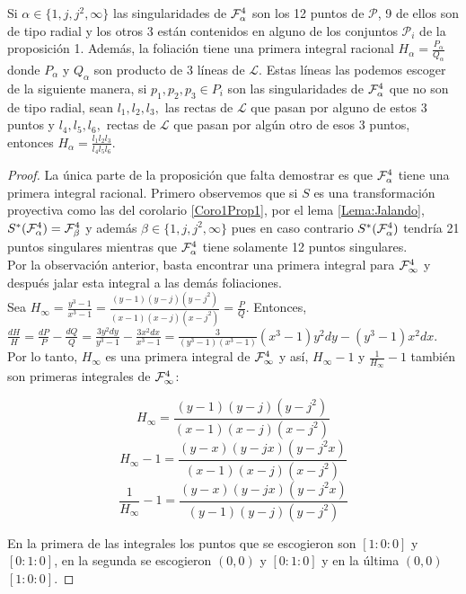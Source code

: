 \begin{Proposicion}
\label{Prop:3}
Si $\alpha\in\{1,j,j^2,\infty\}$ las singularidades de $\Fol[4]{\alpha}$ son los 12 puntos de $\mathcal{P}$, 9 de ellos son de tipo radial y los otros 3 están contenidos en alguno de los conjuntos $\mathcal{P}_i$ de la proposición 1. Además, la foliación tiene una primera integral racional $H_\alpha=\tfrac{P_\alpha}{Q_\alpha}$ donde $P_\alpha$ y $Q_\alpha$ son producto de 3 líneas de $\mathcal{L}$. Estas líneas las podemos escoger de la siguiente manera, si $p_1,p_2,p_3\in\mathit{P}_i$ son las singularidades de $\Fol[4]{\alpha}$ que no son de tipo radial, sean $\mathit{l}_1, \mathit{l}_2, \mathit{l}_3,$ las rectas de $\mathcal{L}$ que pasan por alguno de estos 3 puntos y $\mathit{l}_4, \mathit{l}_5, \mathit{l}_6,$ rectas de $\mathcal{L}$ que pasan por algún otro de esos 3 puntos, entonces $H_\alpha=\tfrac{\mathit{l}_1\mathit{l}_2\mathit{l}_3}{\mathit{l}_4\mathit{l}_5\mathit{l}_6}$.
\end{Proposicion}

\begin{proof}
La única parte de la proposición que falta demostrar es que $\Fol[4]{\alpha}$ tiene una primera integral racional. Primero observemos que si $S$ es una transformación proyectiva como las del corolario \ref{Coro1Prop1}, por el lema \ref{Lema:Jalando}, $S^*(\Fol[4]{\alpha})=\Fol[4]{\beta}$ y además $\beta\in\{1,j,j^2,\infty\}$ pues en caso contrario $S^*(\Fol[4]{\alpha})$ tendría 21 puntos singulares mientras que $\Fol[4]{\alpha}$ tiene solamente 12 puntos singulares.
\\

Por la observación anterior, basta encontrar una primera integral para $\Fol[4]{\infty}$ y después jalar esta integral a las demás foliaciones.
\\

Sea $H_\infty = \tfrac{y^3-1}{x^3-1} = \tfrac{(y-1)(y-j)(y-j^2)}{(x-1)(x-j)(x-j^2)} = \tfrac{P}{Q}$. Entonces, $\tfrac{dH}{H} = \tfrac{dP}{P} - \tfrac{dQ}{Q} = \tfrac{3y^2dy}{y^3-1} - \tfrac{3x^2dx}{x^3-1} = \tfrac{3}{(y^3-1)(x^3-1)}(x^3-1)y^2dy - (y^3-1)x^2dx$. Por lo tanto, $H_\infty$ es una primera integral de $\Fol[4]{\infty}$ y así, $H_\infty - 1$ y $\tfrac{1}{H_\infty} - 1$ también son primeras integrales de $\Fol[4]{\infty}$:

$$H_\infty = \frac{(y-1)(y-j)(y-j^2)}{(x-1)(x-j)(x-j^2)}$$
$$H_\infty - 1 = \frac{(y-x)(y-jx)(y-j^2x)}{(x-1)(x-j)(x-j^2)}$$
$$\frac{1}{H_\infty} - 1 = \frac{(y-x)(y-jx)(y-j^2x)}{(y-1)(y-j)(y-j^2)}$$

En la primera de las integrales los puntos que se escogieron son $[1:0:0]$ y $[0:1:0]$, en la segunda se escogieron $(0,0)$ y $[0:1:0]$ y en la última $(0,0)$  $[1:0:0]$.
\end{proof}

